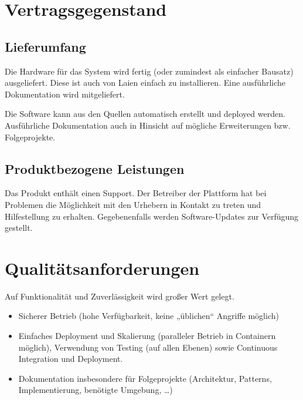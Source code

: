 \chapter{Vertragsgegenstand}

\section{Lieferumfang}

Die Hardware für das System wird fertig (oder zumindest als einfacher Bausatz) ausgeliefert.
Diese ist auch von Laien einfach zu installieren.
Eine ausführliche Dokumentation wird mitgeliefert.

Die Software kann aus den Quellen automatisch erstellt und deployed werden.
Ausführliche Dokumentation auch in Hinsicht auf mögliche Erweiterungen bzw. Folgeprojekte.

\section{Produktbezogene Leistungen}

Das Produkt enthält einen Support.
Der Betreiber der Plattform hat bei Problemen die Möglichkeit mit den Urhebern in Kontakt zu treten und Hilfestellung zu erhalten.
Gegebenenfalls werden Software-Updates zur Verfügung gestellt.


\chapter{Qualitätsanforderungen}

Auf Funktionalität und Zuverlässigkeit wird großer Wert gelegt.

\begin{itemize}
    \item Sicherer Betrieb (hohe Verfügbarkeit, keine „üblichen“ Angriffe möglich)

    \item Einfaches Deployment und Skalierung (paralleler Betrieb in Containern möglich), Verwendung von Testing (auf allen Ebenen) sowie Continuous Integration und Deployment.

    \item Dokumentation insbesondere für Folgeprojekte (Architektur, Patterns, Implementierung, benötigte Umgebung, \dots)
\end{itemize}
